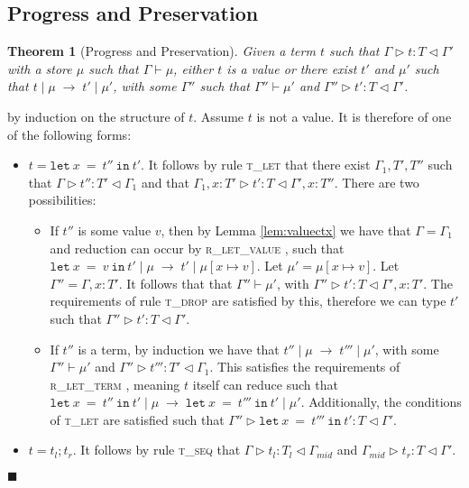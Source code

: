 \documentclass{article}
\newtheorem{thm}{Theorem}
\newcommand{\lemref}[1]{Lemma \ref{#1}}
\newcommand{\rlett}{\textsc{r\_let\_term} }
\newcommand{\rletv}{\textsc{r\_let\_value} }
\newcommand{\tlet}{\textsc{t\_let} }
\newcommand{\tseq}{\textsc{t\_seq} }
\newcommand{\tdrop}{\textsc{t\_drop} }
\newcommand{\typerule}[4]{#1 \triangleright #2 : #3 \triangleleft #4}
\newcommand{\oprule}[4]{#1 \mid #2\;\longrightarrow\;#3 \mid #4}
\newcommand{\lett}[3]{\mathtt{let}\:#1\:\mathtt{=}\:#2\:\mathtt{in}\:#3}
\newcommand{\qed}{$\blacksquare$}
\newenvironment{proof}{\vspace{1ex}\noindent{\bf Proof}\hspace{0.5em}}
  {\hfill\qed\vspace{1ex}}
\begin{document}
\subsection{Progress and Preservation}

\begin{thm}[Progress and Preservation]
Given a term $t$ such that $\typerule{\Gamma}{t}{T}{\Gamma'}$
with a store $\mu$ such that $\Gamma \vdash \mu$, either $t$ is a value or 
there exist $t'$ and $\mu'$ such that
$\oprule{t}{\mu}{t'}{\mu'}$, with some $\Gamma''$ such that
$\Gamma'' \vdash \mu'$ and $\typerule{\Gamma''}{t'}{T}{\Gamma'}$.
\end{thm}

\begin{proof}
by induction on the structure of $t$. Assume $t$ is not a value. It is
therefore of one of the following forms:

\begin{itemize}
\item $t = \lett{x}{t''}{t'}$. 
It follows by rule \tlet that there exist $\Gamma_1, T', T''$
such that
$\typerule{\Gamma}{t''}{T'}{\Gamma_1}$ and that
$\typerule{\Gamma_1, x : T'}{t'}{T}{\Gamma', x : T''}$. There are two
possibilities:

	\begin{itemize}
	\item If $t''$ is some value $v$, then by \lemref{lem:valuectx} 
	we have that $\Gamma = \Gamma_1$ and reduction can occur
	by \rletv, such that 
	$\oprule{\lett{x}{v}{t'}}{\mu}{t'}{\mu [ x \mapsto v ]}$.
	Let $\mu' = \mu [ x \mapsto v ]$. Let $\Gamma'' = \Gamma, x : T'$.
	It follows that that $\Gamma'' \vdash \mu'$, with
	$\typerule{\Gamma''}{t'}{T}{\Gamma', x : T'}$.
	The requirements of rule \tdrop are satisfied by this, therefore we can 
	type $t'$ such that $\typerule{\Gamma''}{t'}{T}{\Gamma'}$.

	\item If $t''$ is a term, 
	by induction we have that $\oprule{t''}{\mu}{t'''}{\mu'}$, with
	some $\Gamma'' \vdash \mu'$ and $\typerule{\Gamma''}{t'''}{T'}{\Gamma_1}$.
	This satisfies the requirements of \rlett, meaning $t$ itself can reduce
	such that $\oprule{\lett{x}{t''}{t'}}{\mu}{\lett{x}{t'''}{t'}}{\mu'}$.
	Additionally, the conditions of \tlet are satisfied such that
	$\typerule{\Gamma''}{\lett{x}{t'''}{t'}}{T}{\Gamma'}$.

	\end{itemize}

\item $t = t_l ; t_r$. It follows by rule
\tseq that $\typerule{\Gamma}{t_l}{T_l}{\Gamma_{mid}}$ and
$\typerule{\Gamma_{mid}}{t_r}{T}{\Gamma'}$.


\end{itemize}
\end{proof}
\end{document}
